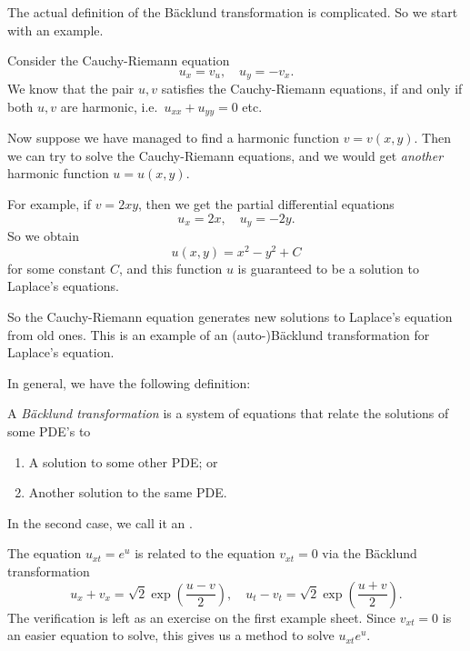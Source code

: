\documentclass[a4paper]{article}
\begin{document}
The actual definition of the B\"acklund transformation is complicated. So we start with an example.
\begin{eg}
  Consider the Cauchy-Riemann equation
  \[
    u_x = v_u,\quad u_y = -v_x.
  \]
  We know that the pair $u, v$ satisfies the Cauchy-Riemann equations, if and only if both $u, v$ are harmonic, i.e.\ $u_{xx} + u_{yy} = 0$ etc.

  Now suppose we have managed to find a harmonic function $v = v(x, y)$. Then we can try to solve the Cauchy-Riemann equations, and we would get \emph{another} harmonic function $u = u(x, y)$.

  For example, if $v = 2xy$, then we get the partial differential equations
  \[
    u_x = 2x,\quad u_y = -2y.
  \]
  So we obtain
  \[
    u(x, y) = x^2 - y^2 + C
  \]
  for some constant $C$, and this function $u$ is guaranteed to be a solution to Laplace's equations.

  So the Cauchy-Riemann equation generates new solutions to Laplace's equation from old ones. This is an example of an (auto-)B\"acklund transformation for Laplace's equation.
\end{eg}

In general, we have the following definition:
\begin{defi}
  A \emph{B\"acklund transformation} is a system of equations that relate the solutions of some PDE's to
  \begin{enumerate}
    \item A solution to some other PDE; or
    \item Another solution to the same PDE.
  \end{enumerate}
  In the second case, we call it an .
\end{defi}

\begin{eg}
  The equation $u_{xt} = e^u$ is related to the equation $v_{xt} = 0$ via the B\"acklund transformation
  \[
    u_x + v_x = \sqrt{2} \exp \left(\frac{u - v}{2}\right),\quad u_t - v_t = \sqrt{2} \exp\left(\frac{u + v}{2}\right).
  \]
  The verification is left as an exercise on the first example sheet. Since $v_{xt} = 0$ is an easier equation to solve, this gives us a method to solve $u_{xt} e^u$.
\end{eg}
\end{document}
